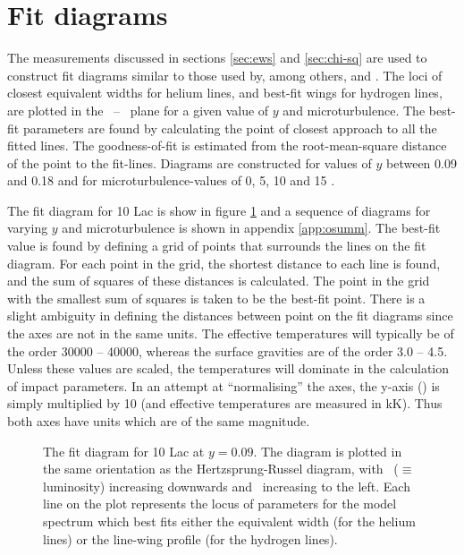 \section{Fit diagrams}
\label{sec:ew_analysis}

The measurements discussed in sections \ref{sec:ews} and
\ref{sec:chi-sq} are used to construct fit diagrams similar to those
used by, among others,  and . The loci of
closest equivalent widths for helium lines, and best-fit wings for
hydrogen lines, are plotted in the \teff\ -- \logg\ plane for a given
value of $y$ and microturbulence. The best-fit parameters are found by
calculating the point of closest approach to all the fitted lines. The
goodness-of-fit is estimated from the root-mean-square distance of the
point to the fit-lines. Diagrams are constructed for values of $y$
between 0.09 and 0.18 and for microturbulence-values of 0, 5, 10 and
15 \kms.

The fit diagram for 10 Lac is show in figure \ref{fig:10lac:ewd} and a
sequence of diagrams for varying $y$ and microturbulence is shown in
appendix \ref{app:osumm}. The best-fit value is found by defining a
grid of points that surrounds the lines on the fit diagram. For each
point in the grid, the shortest distance to each line is found, and
the sum of squares of these distances is calculated. The point in the
grid with the smallest sum of squares is taken to be the best-fit
point. There is a slight ambiguity in defining the distances between
point on the fit diagrams since the axes are not in the same
units. The effective temperatures will typically be of the order 30000
-- 40000, whereas the surface gravities are of the order 3.0 --
4.5. Unless these values are scaled, the temperatures will dominate in
the calculation of impact parameters. In an attempt at ``normalising''
the axes, the y-axis (\logg) is simply multiplied by 10 (and effective
temperatures are measured in kK). Thus both axes have units which are
of the same magnitude.

\begin{figure} %

\epsfxsize=12cm
\setlength{\cen}{(\textwidth / 2) - (\epsfxsize / 2)}
\hspace{\cen}

\caption[Fit diagram for 10 Lac]
{\fcfont The fit diagram for 10 Lac at $y = 0.09$. The diagram is
plotted in the same orientation as the Hertzsprung-Russel diagram,
with \logg\ ($\equiv$ luminosity) increasing downwards and
\teff\ increasing to the left. Each line on the plot represents the
locus of parameters for the model spectrum which best fits either the
equivalent width (for the helium lines) or the line-wing profile (for the
hydrogen lines).}
\label{fig:10lac:ewd}
\end{figure} %

